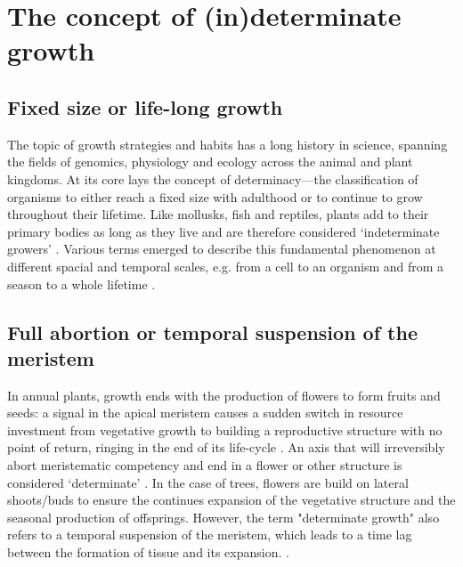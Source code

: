 \documentclass{article}
\begin{document}
	
\section*{The concept of (in)determinate growth}
	\subsection*{Fixed size or life-long growth}
	The topic of growth strategies and habits has a long history in science, spanning the fields of genomics, physiology and ecology across the animal and plant kingdoms. At its core lays the concept of determinacy---the classification of organisms to either reach a fixed size with adulthood or to continue to grow throughout their lifetime. Like mollusks, fish and reptiles, plants add to their primary bodies as long as they live and are therefore considered `indeterminate growers' \citep{ejsmondHowTimeGrowth2010}. Various terms emerged to describe this fundamental phenomenon at different spacial and temporal scales, e.g. from a cell to an organism and from a season to a whole lifetime \citep{mcdanielInductionDeterminationDevelopmental1992a, karkachTrajectoriesModelsIndividual2006}. \\

	\subsection*{Full abortion or temporal suspension of the meristem}
	In annual plants, growth ends with the production of flowers to form fruits and seeds: a signal in the apical meristem causes a sudden switch in resource investment from vegetative growth to building a reproductive structure with no point of return, ringing in the end of its life-cycle \citep{poethigPhaseChangeRegulation2003, huijserControlDevelopmentalPhase2011}. An axis that will irreversibly abort meristematic competency and end in a flower or other structure is considered `determinate' \citep{barthelemyPlantArchitectureDynamic2007}. In the case of trees, flowers are build on lateral shoots/buds to ensure the continues expansion of the vegetative structure and the seasonal production of offsprings. However, the term "determinate growth" also refers to a temporal suspension of the meristem, which leads to a time lag between the formation of tissue and its expansion. \citep{kozlowskiSeedGerminationOntogeny2012, halleTropicalTreesForests1978}. 
	
\end{document}

